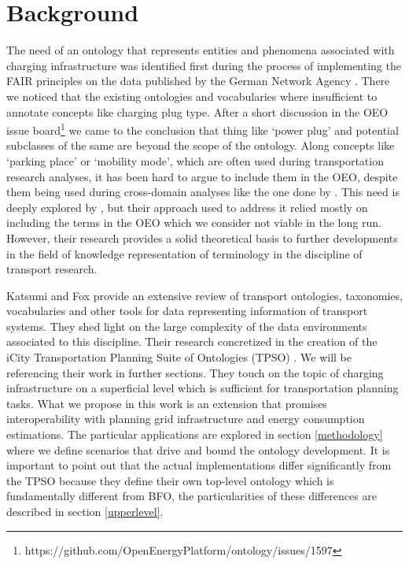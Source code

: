 ﻿\section{Background}
\label{statementofneed}
The need of an ontology that represents entities and phenomena associated with
charging infrastructure was identified first during the process of implementing
the FAIR principles on the data published by the German Network Agency
\cite{ArellanoRuiz.2024}. There we noticed that the existing ontologies and
vocabularies where insufficient to annotate concepts like charging plug type.
After a short discussion in the OEO issue
board\footnote{https://github.com/OpenEnergyPlatform/ontology/issues/1597} we
came to the conclusion that thing like `power plug' and potential subclasses of
the same are beyond the scope of the ontology. Along concepts like `parking
place' or `mobility mode', which are often used during transportation research
analyses, it has been hard to argue to include them in the OEO, despite them
being used during cross-domain analyses like the one done by \cite{Hecht.2022}.
This need is deeply explored by \cite{Mittermeier.2023}, but their approach
used to address it relied mostly on including the terms in the OEO which we
consider not viable in the long run. However, their research provides a solid
theoretical basis to further developments in the field of knowledge
representation of terminology in the discipline of transport research.

Katsumi and Fox \cite{Katsumi.2018} provide an extensive review of transport
ontologies, taxonomies, vocabularies and other tools for data representing
information of transport systems. They shed light on the large complexity of
the data environments associated to this discipline. Their research concretized
in the creation of the iCity Transportation Planning Suite of Ontologies (TPSO)
\cite{Katsumi.2019}. We will be referencing their work in further sections.
They touch on the topic of charging infrastructure on a superficial level which
is sufficient for transportation planning tasks. What we propose in this work
is an extension that promises interoperability with planning grid
infrastructure and energy consumption estimations. The particular applications
are explored in section \ref{methodology} where we define scenarios that drive
and bound the ontology development. It is important to point out that the
actual implementations differ significantly from the TPSO because they define
their own top-level ontology which is fundamentally different from BFO, the
particularities of these differences are described in section \ref{upperlevel}.

